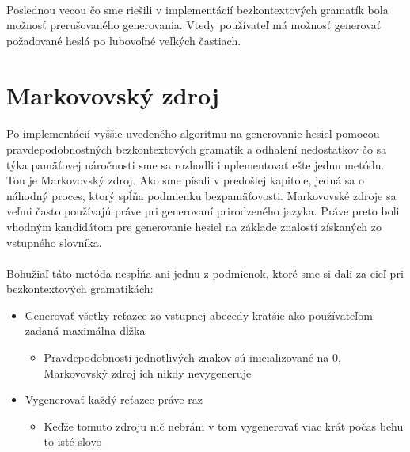 \paragraph{}
Poslednou vecou čo sme riešili v implementácií bezkontextových gramatík bola možnosť prerušovaného generovania. Vtedy používateľ má možnosť generovať požadované heslá po ľubovoľné veľkých častiach.

\section{Markovovský zdroj}
\paragraph{}
Po implementácií vyššie uvedeného algoritmu na generovanie hesiel pomocou pravdepodobnostných bezkontextových gramatík a odhalení nedostatkov čo sa týka pamäťovej náročnosti sme sa rozhodli implementovať ešte jednu metódu. Tou je Markovovský zdroj. Ako sme písali v predošlej kapitole, jedná sa o náhodný proces, ktorý spĺňa podmienku bezpamäťovosti. Markovovské zdroje sa veľmi často používajú práve pri generovaní prirodzeného jazyka. Práve preto boli vhodným kandidátom pre generovanie hesiel na základe znalostí získaných zo vstupného slovníka. 

\paragraph{}
Bohužiaľ táto metóda nespĺňa ani jednu z podmienok, ktoré sme si dali za cieľ pri bezkontextových gramatikách:
\begin{itemize}
	\item Generovať všetky reťazce zo vstupnej abecedy kratšie ako používateľom zadaná maximálna dĺžka
	\begin{itemize}
		\item Pravdepodobnosti jednotlivých znakov sú inicializované na 0, Markovovský zdroj ich nikdy nevygeneruje
	\end{itemize}
	\item Vygenerovať každý reťazec práve raz
	\begin{itemize}
		\item Keďže tomuto zdroju nič nebráni v tom vygenerovať viac krát počas behu to isté slovo
	\end{itemize}
\end{itemize}

